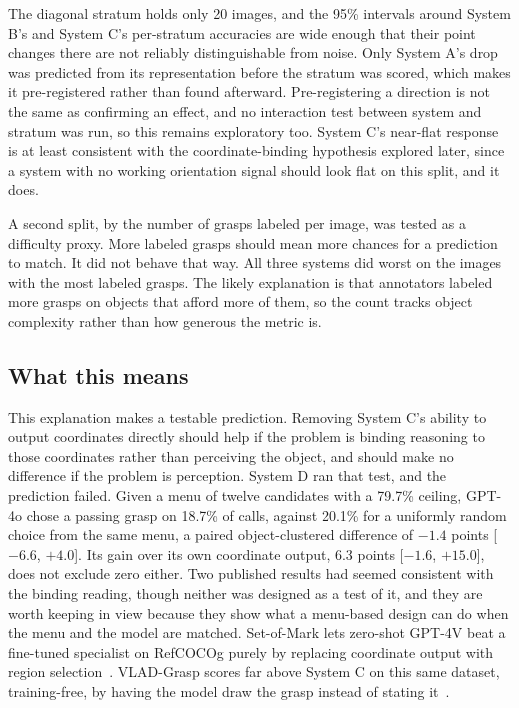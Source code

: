 \documentclass[12pt,letterpaper]{article}
\begin{document}
The diagonal stratum holds only 20 images, and the 95\% intervals
around System B's and System C's per-stratum accuracies are wide enough
that their point changes there are not reliably distinguishable from
noise. Only System A's drop was predicted from its representation
before the stratum was scored, which makes it pre-registered rather
than found afterward. Pre-registering a direction is not the same as
confirming an effect, and no interaction test between system and
stratum was run, so this remains exploratory too. System C's near-flat
response is at least consistent with the coordinate-binding hypothesis
explored later, since a system with no working orientation signal
should look flat on this split, and it does.

A second split, by the number of grasps labeled per image, was tested
as a difficulty proxy. More labeled grasps should mean more chances for
a prediction to match. It did not behave that way. All three systems
did worst on the images with the most labeled grasps. The likely
explanation is that annotators labeled more grasps on objects that
afford more of them, so the count tracks object complexity rather than
how generous the metric is.

\subsection{What this means}

This explanation makes a testable prediction. Removing System C's
ability to output coordinates directly should help if the problem is
binding reasoning to those coordinates rather than perceiving the
object, and should make no difference if the problem is perception.
System D ran that test, and the prediction failed. Given a menu of
twelve candidates with a 79.7\% ceiling, GPT-4o chose a passing grasp
on 18.7\% of calls, against 20.1\% for a uniformly random choice from
the same menu, a paired object-clustered difference of $-1.4$ points
[$-6.6$, $+4.0$]. Its gain over its own coordinate output, 6.3 points
[$-1.6$, $+15.0$], does not exclude zero either. Two published results
had seemed consistent with the binding reading, though neither was
designed as a test of it, and they are worth keeping in view because
they show what a menu-based design can do when the menu and the model
are matched. Set-of-Mark lets zero-shot GPT-4V beat a
fine-tuned specialist on RefCOCOg purely by replacing coordinate output
with region selection~\cite{yang2024}. VLAD-Grasp scores far above System
C on this same dataset, training-free, by having the model draw the
grasp instead of stating it~\cite{kulshrestha2025}.
\end{document}
